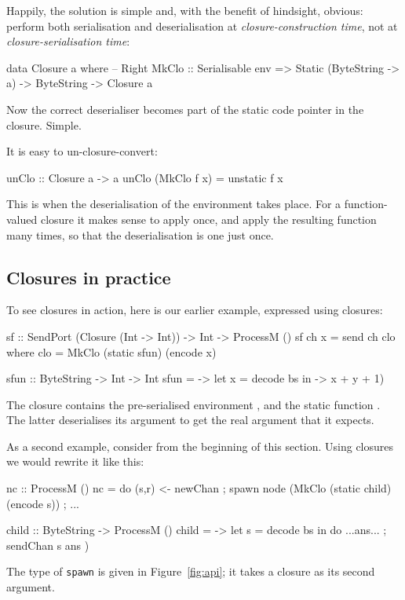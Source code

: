 \documentclass[preprint]{sigplanconf}
\begin{document}
Happily, the solution is simple and, with the benefit of hindsight,
obvious: perform both serialisation and deserialisation at \emph{closure-construction time},
not at \emph{closure-serialisation time}:
\begin{code}
data Closure a where   -- Right
  MkClo :: Serialisable env
        => Static (ByteString -> a) 
        -> ByteString -> Closure a
\end{code}
Now the correct deserialiser becomes part of the static code pointer 
in the closure.  Simple.

It is easy to un-closure-convert:
\begin{code}
  unClo :: Closure a -> a
  unClo (MkClo f x) = unstatic f x
\end{code}
This is when the deserialisation of the environment takes place. For a
function-valued closure it makes sense to apply  once, and
apply the resulting function many times, so that the deserialisation is
one just once.

\subsection{Closures in practice} \label{s:closures-in-practice}

To see closures in action, here is our earlier  example, 
expressed using closures:
\begin{code}
  sf :: SendPort (Closure (Int -> Int)) 
     -> Int -> ProcessM ()
  sf ch x = send ch clo
    where
      clo  = MkClo (static sfun) (encode x)

  sfun :: ByteString -> Int -> Int
  sfun = \bs -> let x = decode bs 
             in \y -> x + y + 1)
\end{code}
The closure contains the pre-serialised environment ,
and the static function . The latter deserialises its
argument  to get the real argument  that it expects.

As a second example, consider  from the beginning of this section.
Using closures we would rewrite it like this:
\begin{code}
  nc :: ProcessM ()
  nc = do { (s,r) <- newChan
          ; spawn node (MkClo (static child) (encode s))
          ; ... }

  child :: ByteString -> ProcessM ()
  child = \bs -> let s = decode bs
              in do { ...ans...
                    ; sendChan s ans })
\end{code}
The type of \texttt{spawn} is given in Figure~\ref{fig:api}; it takes
a closure as its second argument.
\end{document}
